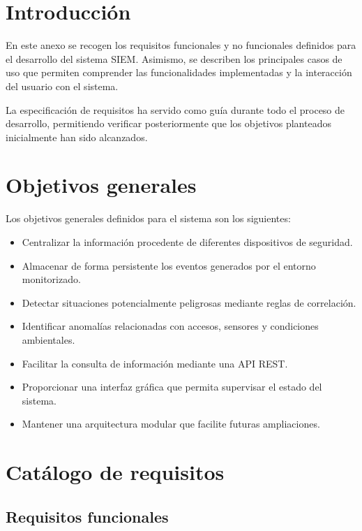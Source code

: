 
\section{Introducción}

En este anexo se recogen los requisitos funcionales y no funcionales definidos para el desarrollo del sistema SIEM. Asimismo, se describen los principales casos de uso que permiten comprender las funcionalidades implementadas y la interacción del usuario con el sistema.

La especificación de requisitos ha servido como guía durante todo el proceso de desarrollo, permitiendo verificar posteriormente que los objetivos planteados inicialmente han sido alcanzados.

\section{Objetivos generales}
Los objetivos generales definidos para el sistema son los siguientes:

\begin{itemize}
\item Centralizar la información procedente de diferentes dispositivos de seguridad.
\item Almacenar de forma persistente los eventos generados por el entorno monitorizado.
\item Detectar situaciones potencialmente peligrosas mediante reglas de correlación.
\item Identificar anomalías relacionadas con accesos, sensores y condiciones ambientales.
\item Facilitar la consulta de información mediante una API REST.
\item Proporcionar una interfaz gráfica que permita supervisar el estado del sistema.
\item Mantener una arquitectura modular que facilite futuras ampliaciones.
\end{itemize}

\section{Catálogo de requisitos}
\subsection{Requisitos funcionales}

